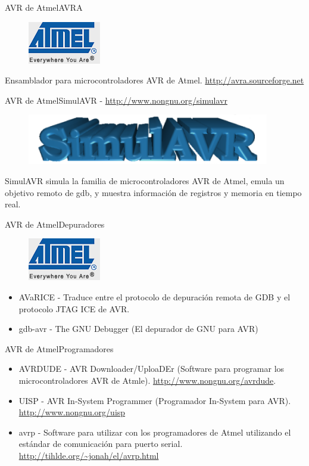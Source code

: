 \documentclass{beamer}
\begin{document}
\begin{frame}{AVR de Atmel}{AVRA}
  \begin{figure}[!h]
    \centering
    \includegraphics[scale=2]{img/atmel_logo.jpg}
  \end{figure}
  Ensamblador para microcontroladores AVR de Atmel.
  \url{http://avra.sourceforge.net}
\end{frame}

\begin{frame}{AVR de Atmel}{SimulAVR - \url{http://www.nongnu.org/simulavr}}
  \begin{figure}[!h]
    \centering
    \includegraphics[scale=0.5]{img/simulavr_logo.png}
  \end{figure}
  SimulAVR simula la familia de microcontroladores AVR de Atmel, emula un objetivo remoto de gdb, y muestra información de registros y memoria en tiempo real.
\end{frame}

\begin{frame}{AVR de Atmel}{Depuradores}
  \begin{figure}[!h]
    \centering
    \includegraphics[scale=2]{img/atmel_logo.jpg}
  \end{figure}
  \begin{itemize}
  \item AVaRICE - Traduce entre el protocolo de depuración remota de GDB y el protocolo JTAG ICE de AVR.
  \item gdb-avr - The GNU Debugger (El depurador de GNU para AVR)
  \end{itemize}
\end{frame}

\begin{frame}{AVR de Atmel}{Programadores}
  \begin{itemize}
  \item AVRDUDE - AVR Downloader/UploaDEr (Software para programar los microcontroladores AVR de Atmle). \url{http://www.nongnu.org/avrdude}.
  \item UISP - AVR In-System Programmer (Programador In-System para AVR). \url{http://www.nongnu.org/uisp}
  \item avrp - Software para utilizar con los programadores de Atmel utilizando el estándar de comunicación para puerto serial. \url{http://tihlde.org/~jonah/el/avrp.html}
  \end{itemize}
\end{frame}
\end{document}
